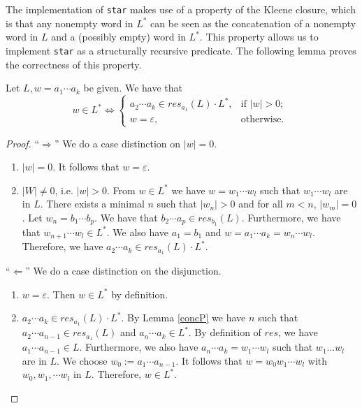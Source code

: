 
    
    The implementation of \lstinline{star} makes use of a property of the Kleene closure, 
    which is that any nonempty word in $L^*$ can be seen as the concatenation of a nonempty word in $L$ and a (possibly empty) word in $L^*$.
    This property allows us to implement \lstinline{star} as a structurally recursive predicate.
    The following lemma proves the correctness of this property.

    \begin{lemma}
        \label{starP}
        Let $L, w = a_1 \cdots a_k$ be given. We have that
        \begin{equation*}
            w \in L^*   
            \iff
                \left\{
                    \begin{array}{ll}
                         a_2 \cdots a_k \in res_{a_1}(L) \cdot L^*, & \mbox{if } |w| > 0; \\
                         w = \varepsilon, & \mbox{otherwise. }
                    \end{array}
                \right.
        \end{equation*}
    \end{lemma}
    \begin{proof}
        ``$\Rightarrow$'' 
        We do a case distinction on $|w| = 0$.
        \begin{enumerate}
            \item
                $|w| = 0$. It follows that $w = \varepsilon$.
            \item
                $|W| \neq 0$, i.e. $|w| > 0$.
                From $w \in L^*$ we have $w = w_1 \cdots w_l$ such that $w_1 \cdots w_l$ are in $L$.
                There exists a minimal $n$ such that $|w_n| > 0$ and for all $m < n$, $|w_m| = 0$.
                Let $w_n = b_1 \cdots b_p$. We have that $b_2 \cdots a_p \in res_{b_1}(L)$.
                Furthermore, we have that $w_{n+1} \cdots w_l \in L^*$.
                We also have $a_1 = b_1$ and $w = a_1 \cdots a_k = w_n \cdots w_l$. 
                Therefore, we have $a_2 \cdots a_k \in res_{a_1}(L) \cdot L^*$.
        \end{enumerate}
        ``$\Leftarrow$'' 
        We do a case distinction on the disjunction.
        \begin{enumerate}
            \item
                $w = \varepsilon$. Then $w \in L^*$ by definition.
            \item
                $a_2 \cdots a_k \in res_{a_1}(L) \cdot L^*$. 
                By Lemma \ref{concP} we have $n$ such that $a_2 \cdots a_{n-1} \in res_{a_1}(L)$ and $a_n \cdots a_k \in L^*$.
                By definition of $res$, we have $a_1 \cdots a_{n-1} \in L$.
                Furthermore, we also have $a_n \cdots a_k = w_1 \cdots w_l$ such that $w_1 \ldots w_l$ are in $L$.
                We choose $w_0 := a_1 \cdots a_{n-1}$.
                It follows that $w = w_0 w_1 \cdots w_l$ with $w_0, w_1, \cdots w_l$ in $L$.
                Therefore, $w \in L^*$.
        \end{enumerate}
    \end{proof}

